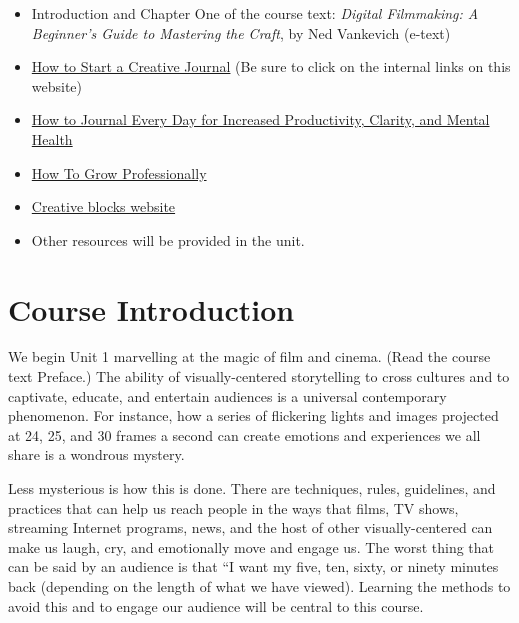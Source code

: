 \documentclass[
]{book}
\providecommand{\tightlist}{%
  \setlength{\itemsep}{0pt}\setlength{\parskip}{0pt}}
\begin{document}
\begin{itemize}
\tightlist
\item
  Introduction and Chapter One of the course text: \emph{Digital Filmmaking: A Beginner's Guide to Mastering the Craft}, by Ned Vankevich (e-text)\\
\item
  \href{https://karenbanes.com/how-to-start-a-creative-journal}{How to Start a Creative Journal} (Be sure to click on the internal links on this website)\\
\item
  \href{https://www.youtube.com/watch?v=hUTWo7_W0lc}{How to Journal Every Day for Increased Productivity, Clarity, and Mental Health}\\
\item
  \href{https://brandyourself.com/blog/guide/how-to-grow-professionally/}{How To Grow Professionally}\\
\item
  \href{https://www.goodtherapy.org/learn-about-therapy/issues/creative-blocks}{Creative blocks website}\\
\item
  Other resources will be provided in the unit.
\end{itemize}

\hypertarget{course-introduction}{%
\section{Course Introduction}\label{course-introduction}}

We begin Unit 1 marvelling at the magic of film and cinema. (Read the course text Preface.) The ability of visually-centered storytelling to cross cultures and to captivate, educate, and entertain audiences is a universal contemporary phenomenon. For instance, how a series of flickering lights and images projected at 24, 25, and 30 frames a second can create emotions and experiences we all share is a wondrous mystery.

Less mysterious is how this is done. There are techniques, rules, guidelines, and practices that can help us reach people in the ways that films, TV shows, streaming Internet programs, news, and the host of other visually-centered can make us laugh, cry, and emotionally move and engage us. The worst thing that can be said by an audience is that ``I want my five, ten, sixty, or ninety minutes back (depending on the length of what we have viewed). Learning the methods to avoid this and to engage our audience will be central to this course.
\end{document}
